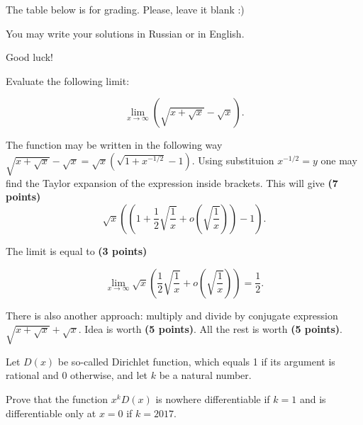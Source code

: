 \documentclass[addpoints, answers]{exam} %
\begin{document}
\pointname{\%}
\renewcommand{\solutiontitle}{}

The table below is for grading. Please, leave it blank :)
\begin{center}
  \gradetable[h][questions]
\end{center}

You may write your solutions in Russian or in English.

\begin{flushright}
Good luck!
\end{flushright}


\begin{questions}

\question[10] Evaluate the following limit:

\[
\lim_{x \to \infty} \left( \sqrt{x+\sqrt{x}} - \sqrt{x} \right).
\]

\begin{solution}

The function may be written in the following way $\sqrt{x+\sqrt{x}} - \sqrt{x} = \sqrt{x} \left( \sqrt{1+x^{-1/2}} -1 \right)$. Using substituion $x^{-1/2} = y$ one may find the Taylor expansion of the expression inside brackets. This will give \textbf{(7 points)}
\[
\sqrt{x} \left( \left( 1+\frac{1}{2} \sqrt{\frac{1}{x}} + o \left(\sqrt{\frac{1}{x}}\right) \right) -1 \right).
\]

The limit is equal to \textbf{(3 points)}

\[
\lim_{x \to \infty} \sqrt{x} \left( \frac{1}{2} \sqrt{\frac{1}{x}} + o \left(\sqrt{\frac{1}{x}} \right) \right) = \frac{1}{2}.
\]

There is also another approach: multiply and divide by conjugate expression $\sqrt{x + \sqrt{x}} + \sqrt{x}$. Idea is worth \textbf{(5 points)}. All the rest is worth \textbf{(5 points)}.

\end{solution}

\question[10] Let $D(x)$ be so-called Dirichlet function, which equals 1 if its argument is rational and 0 otherwise, and let $k$ be a natural number.

Prove that the function $x^k D(x)$ is nowhere differentiable if $k=1$ and is differentiable only at $x=0$ if $k=2017$.

\begin{solution}


\end{solution}
\end{questions}
\end{document}
